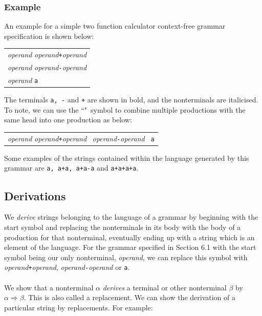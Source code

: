 \documentclass[a4paper, 11pt]{article}
\begin{document}
\subsubsection{Example}
An example for a simple two function calculator context-free grammar specification is shown below:

\begin{center}
	\begin{tabular}{l}
		\textit{operand} \textbf{\textrightarrow} \textit{operand}\texttt{+}\textit{operand} \\
		\textit{operand} \textbf{\textrightarrow} \textit{operand}\texttt{-}\textit{operand} \\
		\textit{operand} \textbf{\textrightarrow} \texttt{a}
	\end{tabular}
\end{center}

The terminals \texttt{a, -} and \texttt{+} are shown in bold, and the nonterminals are italicised. To note, we can use the ``\textbar"\ symbol to combine multiple productions with the same head into one production as below:

\begin{center}
	\begin{tabular}{l}
		\textit{operand} \textbf{\textrightarrow} \textit{operand}\texttt{+}\textit{operand} \textbar\ \textit{operand}\texttt{-}\textit{operand} \textbar\ \texttt{a}
	\end{tabular}
\end{center}

Some examples of the strings contained within the language generated by this grammar are \texttt{a, a+a, a+a-a} and \texttt{a+a+a+a}. 

\subsection{Derivations}
We \textit{derive} strings belonging to the language of a grammar by beginning with the start symbol and replacing the nonterminals in its body with the body of a production for that nonterminal, eventually ending up with a string which is an element of the language. For the grammar specified in Section 6.1 with the start symbol being our only nonterminal, \textit{operand}, we can replace this symbol with \textit{operand}\texttt{+}\textit{operand}, \textit{operand}\texttt{-}\textit{operand} or \texttt{a}.
\\\\
We show that a nonterminal $\alpha$ \textit{derives} a terminal or other nonterminal $\beta$ by $\alpha \Rightarrow \beta$. This is also called a replacement. We can show the derivation of a particular string by replacements. For example:
\end{document}
